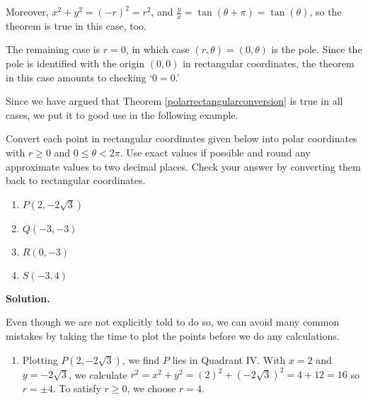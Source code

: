 \documentclass{ximera}
\begin{document}
\smallskip

Moreover, $x^2 + y^2 = (-r)^2 = r^2$, and $\frac{y}{x} = \tan(\theta + \pi) = \tan(\theta)$, so the theorem is true in this case, too.  

\smallskip

The remaining case is $r = 0$, in which case $(r,\theta) = (0,\theta)$ is the pole.  Since the pole is identified with the origin $(0,0)$ in rectangular coordinates, the theorem in this case amounts to checking `$0=0$.'  

\smallskip

Since we have argued that  Theorem \ref{polarrectangularconversion} is true in all cases, we put it to good use in the following example.

\smallskip


\begin{ex}  \label{pointconversionex}   Convert each point in rectangular coordinates given below into polar coordinates with $r \geq 0$ and $0 \leq \theta < 2\pi$.  Use exact values if possible and round any approximate values to two decimal places.  Check your answer by converting them back to rectangular coordinates.

\begin{multicols}{4}

\begin{enumerate}

\item  $P\left(2,-2\sqrt{3}\right)$

\item  $Q(-3,-3)$

\item  $R(0,-3)$

\item  $S(-3,4)$

\end{enumerate}

\end{multicols}

{\bf Solution.}

Even though we are not explicitly told to do so, we can avoid many common mistakes by taking the time to plot the points before we do any calculations. 


\begin{enumerate}

\item  Plotting $P\left(2,-2\sqrt{3}\right)$, we find $P$ lies in Quadrant IV. With $x = 2$ and $y = -2\sqrt{3}$, we calculate $r^2 = x^2 + y^2 = (2)^2 + \left(-2\sqrt{3}\right)^2 = 4+12 = 16$ so $r = \pm 4$.  To satisfy $r \geq 0$, we choose $r = 4$.  


\end{enumerate}
\end{ex}
\end{document}
